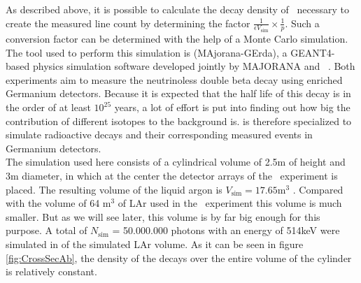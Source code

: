 \documentclass[encoding=utf8,british]{tumphthesis}
\begin{document}
As described above, it is possible to calculate the decay density of \Kr\ necessary to create the measured line count by determining the factor $\frac{1}{\epsilon V_{\mathrm{sim}}} \times \frac{1}{p}$. 
Such a conversion factor can be determined with the help of a Monte Carlo simulation.
The tool used to perform this simulation is \mage (MAjorana-GErda), a GEANT4-based physics simulation software developed jointly by MAJORANA and \gerda\ \cite{boswell_mage_2010}.
Both experiments aim to measure the neutrinoless double beta decay using enriched Germanium detectors.
Because it is expected that the half life of this decay is in the order of at least \(10^{25}\) years, a lot of effort is put into finding out how big the contribution of different isotopes to the background is.
\mage is therefore specialized to simulate radioactive decays and their corresponding measured events in Germanium detectors.
\\

The simulation used here consists of a cylindrical volume of 2.5m of height and 3m diameter, in which at the center the detector arrays of the \gerda\ experiment is placed.
The resulting volume of the liquid argon is $V_{\mathrm{sim}} = 17.65 \mathrm{m}^3$ .
Compared with the volume of 64 m\(^3\) of LAr used in the \gerda\ experiment this volume is much smaller.
But as we will see later, this volume is by far big enough for this purpose.
A total of $N_{\mathrm{sim}}$ = 50.000.000 photons with an energy of 514keV were simulated in of the simulated LAr volume. 
As it can be seen in figure \ref{fig:CrossSecAb}, the density of the decays over the entire volume of the cylinder is relatively constant.
\\
\end{document}
